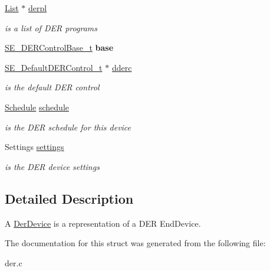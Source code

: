 \begin{DoxyCompactItemize}
\mbox{\label{structDerDevice_a9cca4b49701f220a5f59f0f777a1a92a}} 
\hyperlink{structList}{List} $\ast$ \hyperlink{structDerDevice_a9cca4b49701f220a5f59f0f777a1a92a}{derpl}
\begin{DoxyCompactList}\small\item\em is a list of D\+ER programs \end{DoxyCompactList}\item 
\mbox{\label{structDerDevice_a8f0e2c372e26e78853a4a914c1d6de7b}} 
\hyperlink{structSE__DERControlBase__t}{S\+E\+\_\+\+D\+E\+R\+Control\+Base\+\_\+t} {\bfseries base}
\item 
\mbox{\label{structDerDevice_aa5d5e981015f0fe3ad097dd64bbd76b7}} 
\hyperlink{structSE__DefaultDERControl__t}{S\+E\+\_\+\+Default\+D\+E\+R\+Control\+\_\+t} $\ast$ \hyperlink{structDerDevice_aa5d5e981015f0fe3ad097dd64bbd76b7}{dderc}
\begin{DoxyCompactList}\small\item\em is the default D\+ER control \end{DoxyCompactList}\item 
\mbox{\label{structDerDevice_a37ce98a6f6b47c3b9425a1d4b5965719}} 
\hyperlink{structSchedule}{Schedule} \hyperlink{structDerDevice_a37ce98a6f6b47c3b9425a1d4b5965719}{schedule}
\begin{DoxyCompactList}\small\item\em is the D\+ER schedule for this device \end{DoxyCompactList}\item 
\mbox{\label{structDerDevice_a806004238d0ad13404e82b98620746ec}} 
Settings \hyperlink{structDerDevice_a806004238d0ad13404e82b98620746ec}{settings}
\begin{DoxyCompactList}\small\item\em is the D\+ER device settings \end{DoxyCompactList}\end{DoxyCompactItemize}


\subsection{Detailed Description}
A \hyperlink{structDerDevice}{Der\+Device} is a representation of a D\+ER End\+Device. 

The documentation for this struct was generated from the following file\+:\begin{DoxyCompactItemize}
\item 
der.\+c\end{DoxyCompactItemize}
